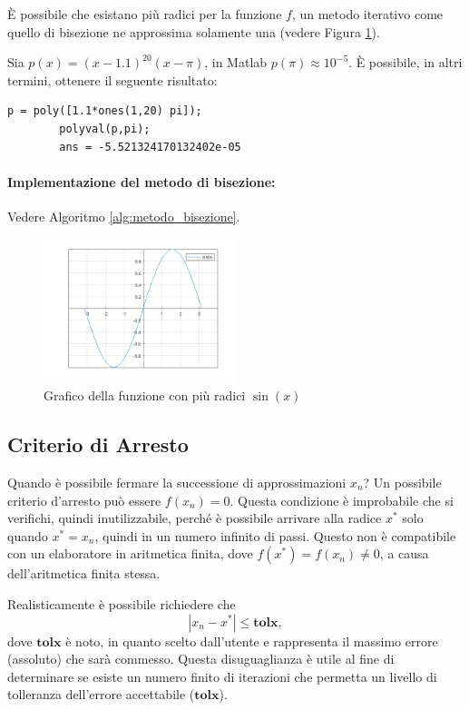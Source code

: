È possibile che esistano più radici per la funzione $f$, un metodo iterativo come quello di bisezione ne approssima solamente una (vedere Figura \ref{fig:doubleRadix}).


\begin{example}
	Sia $p(x)=(x-1.1)^{20}(x-\pi)$, in Matlab $p(\pi)\approx 10^{-5}$. È possibile, in altri termini, ottenere il seguente risultato:
	\begin{lstlisting}[style=Matlab-editor]
		p = poly([1.1*ones(1,20) pi]);
		polyval(p,pi);
		ans = -5.521324170132402e-05
	\end{lstlisting}
\end{example}

\paragraph{Implementazione del metodo di bisezione:} Vedere Algoritmo \ref{alg:metodo_bisezione}.

\begin{figure}
	\centering
	\includegraphics[width=0.5\textwidth]{immagini/tripleRadix.png}
	\caption{\label{fig:doubleRadix}Grafico della funzione con più radici $\sin{(x)}$}
\end{figure}

\subsection{Criterio di Arresto}\label{sec:critArresto}
Quando è possibile fermare la successione di approssimazioni $x_n$? Un possibile criterio d'arresto può essere $f(x_n)=0$. Questa condizione è improbabile che si verifichi, quindi inutilizzabile, perché è possibile arrivare alla radice $x^*$ solo quando $x^*=x_n$, quindi in un numero infinito di passi. Questo non è compatibile con un elaboratore in aritmetica finita, dove $f(x^*)=f(x_n)\neq 0$, a causa dell'aritmetica finita stessa.

Realisticamente è possibile richiedere che 
\begin{equation}\label{eq:x_n_leq_tolx}
	|x_n-x^*|\leq \boldsymbol{tolx},
\end{equation}
dove $\boldsymbol{tolx}$ è noto, in quanto scelto dall'utente e rappresenta il massimo errore (assoluto) che sarà commesso. Questa disuguaglianza è utile al fine di determinare se esiste un numero finito di iterazioni che permetta un livello di tolleranza dell'errore accettabile ($\boldsymbol{tolx}$).

